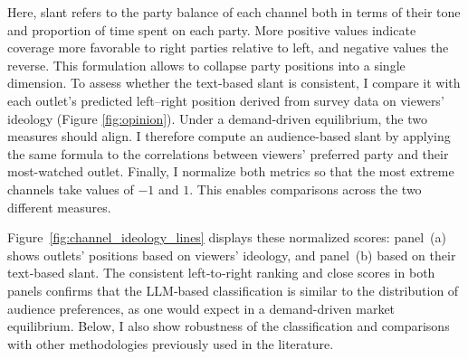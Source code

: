 \documentclass[12pt]{article}
\begin{document}
	Here, slant refers to the party balance of each channel both in terms of their tone and proportion of time spent on each party. More positive values indicate coverage more favorable to right parties relative to left,  and negative values the reverse. This formulation allows to collapse party positions into a single dimension.  To assess whether the text-based slant is consistent, I compare it with each outlet’s predicted left–right position derived from survey data on viewers’ ideology (Figure \ref{fig:opinion}). Under a demand-driven equilibrium, the two measures should align. I therefore compute an audience-based slant by applying the same formula to the correlations between viewers’ preferred party and their most-watched outlet. Finally, I  normalize both metrics so that the most extreme channels take values of $-1$ and $1$. This enables comparisons across the two different measures.
	
	
	
	
	Figure~\ref{fig:channel_ideology_lines} displays these normalized scores: panel~(a) shows outlets' positions based on viewers’ ideology, and panel~(b) based on their text‐based slant. The consistent left‐to‐right ranking and close scores in both panels confirms that the LLM‐based classification is similar to  the distribution of audience preferences, as one would expect in  a demand-driven market equilibrium. Below, I also show robustness of the classification and comparisons with other methodologies previously used in the literature.
	
	
	
\end{document}
